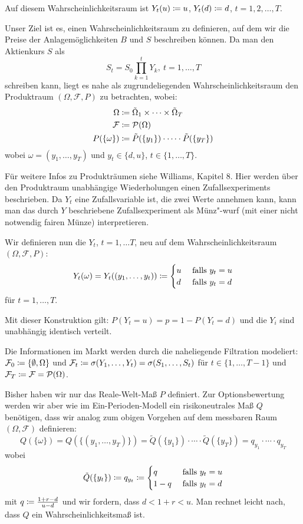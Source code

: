 \documentclass[a4paper,twoside,DIV15,BCOR12mm]{scrbook}
\newcommand{\cF}{\mathcal F}
\begin{document}
Auf diesem Wahrscheinlichkeitsraum ist $Y_t(u)\da u$, $Y_t(d)\da d$, $t=1, 2,\ldots, T$.

 Unser Ziel ist es, einen Wahrscheinlichkeitsraum zu definieren, auf dem wir die Preise der Anlagemöglichkeiten $B$ und $S$ beschreiben können. Da man den Aktienkurs $S$ als
\[
S_t=S_0 \prod_{k=1}^t Y_k,\ t=1,\ldots, T
\]
schreiben kann, liegt es nahe als zugrundeliegenden Wahrscheinlichkeitsraum den Produktraum $(\Omega, \cF, P)$ zu betrachten, wobei:
\begin{align*}
\Omega &\da \tilde\Omega_1 \times \cdots \times \tilde\Omega_T \\ %
\cF &\da \mathcal{P}(\Omega) \\
P(\{\omega\}) &\da \tilde{P}(\{y_1\})\cdot \cdots\cdot \tilde{P}(\{y_T\})
\end{align*}
wobei $\omega=(y_1, \ldots, y_T)$ und $y_t \in \{d,u\}$, $t\in\{1,\ldots,T\}$.

Für weitere Infos zu Produkträumen siehe Williams, Kapitel 8. Hier werden über den Produktraum unabhängige Wiederholungen einen Zufallsexperiments beschrieben. Da $Y_t$ eine Zufallsvariable ist, die zwei Werte annehmen kann, kann man das durch $Y$ beschriebene Zufallsexperiment als Münz"-wurf (mit einer nicht notwendig fairen Münze) interpretieren.


 Wir definieren nun die $Y_t$, $t=1, \ldots T$, neu auf dem Wahrscheinlichkeitsraum $(\Omega, \cF , P)$:
\[
Y_t(\omega)=Y_t((y_1,\ldots,y_t))\da 
 \begin{cases}
 u & \mbox{ falls } y_t=u\\
 d & \mbox{ falls } y_t=d
 \end{cases}
\]
für $t=1, \ldots, T$.

 Mit dieser Konstruktion gilt: $P(Y_t=u)=p=1-P(Y_t=d)$ und die $Y_i$ sind unabhängig identisch verteilt.

 Die Informationen im Markt werden durch die naheliegende Filtration modeliert:
 $\cF_0\da \{\emptyset, \Omega\}$ und $\cF_t\da \sigma(Y_1,\ldots,Y_t)=\sigma(S_1,\ldots, S_t)$ für $t\in\{1,\ldots, T-1\}$ und $\cF_T\da \cF=\mathcal{P}(\Omega)$.

 Bisher haben wir nur das Reale-Welt-Maß $P$ definiert. Zur Optionsbewertung werden wir aber wie im Ein-Perioden-Modell ein risikoneutrales Maß $Q$ benötigen, dass wir analog zum obigen Vorgehen auf dem messbaren Raum $(\Omega, \cF)$ definieren:
\[
Q(\{\omega\}) = Q(\{(y_1,\ldots, y_T)\})=\tilde{Q}(\{y_1\}) \cdot\cdots\cdot \tilde{Q}(\{y_T\})=q_{y_1} \cdot\cdots\cdot q_{y_T}
\]
wobei
\[\tilde Q(\{y_t\})\da q_{y_t}\da
\begin{cases}
 q & \mbox{ falls } y_t=u\\
 1-q & \mbox{ falls } y_t=d
 \end{cases}
\]
mit $q\da \frac{1+r-d}{u-d}$ und wir fordern, dass $d<1+r<u$. Man rechnet leicht nach, dass $Q$ ein Wahrscheinlichkeitsmaß ist.
 
\end{document}

